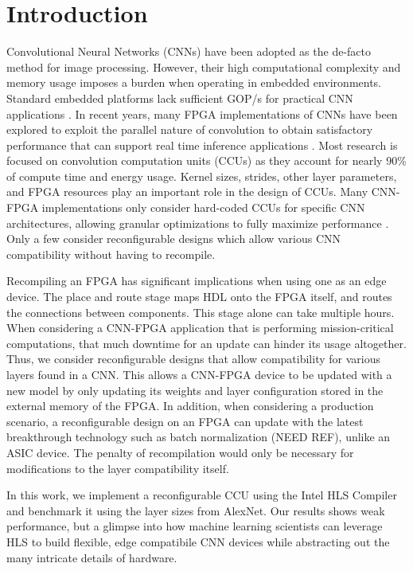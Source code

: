 \chapter {Introduction}
 
Convolutional Neural Networks (CNNs) have been adopted as the de-facto method for image processing. However, their high computational complexity and memory usage imposes a burden when operating in embedded environments. Standard embedded platforms lack sufficient GOP/s for practical CNN applications \cite{guo2018angel}. In recent years, many FPGA implementations of CNNs have been explored to exploit the parallel nature of convolution to obtain satisfactory performance that can support real time inference applications \cite{toledo2012fpga}. Most research is focused on convolution computation units (CCUs) as they account for nearly 90\% of compute time and energy usage. Kernel sizes, strides, other layer parameters, and FPGA resources play an important role in the design of CCUs. Many CNN-FPGA implementations only consider hard-coded CCUs for specific CNN architectures, allowing granular optimizations to fully maximize performance \cite{liu2016automatic, toledo2012fpga, hwang2017efficient, bettoni2017convolutional, jiao2017accelerating}. Only a few consider reconfigurable designs which allow various CNN compatibility without having to recompile\cite{tu2017deep, dicecco2016caffeinated, lu2017evaluating}.

Recompiling an FPGA has significant implications when using one as an edge device. The place and route stage maps HDL onto the FPGA itself, and routes the connections between components. This stage alone can take multiple hours. When considering a CNN-FPGA application that is performing mission-critical computations, that much downtime for an update can hinder its usage altogether. Thus, we consider reconfigurable designs that allow compatibility for various layers found in a CNN. This allows a CNN-FPGA device to be updated with a new model by only updating its weights and layer configuration stored in the external memory of the FPGA. In addition, when considering a production scenario, a reconfigurable design on an FPGA can update with the latest breakthrough technology such as batch normalization (NEED REF), unlike an ASIC device. The penalty of recompilation would only be necessary for modifications to the layer compatibility itself.

In this work, we implement a reconfigurable CCU using the Intel HLS Compiler and benchmark it using the layer sizes from AlexNet. Our results shows weak performance, but a glimpse into how machine learning scientists can leverage HLS to build flexible, edge compatibile CNN devices while abstracting out the many intricate details of hardware.

